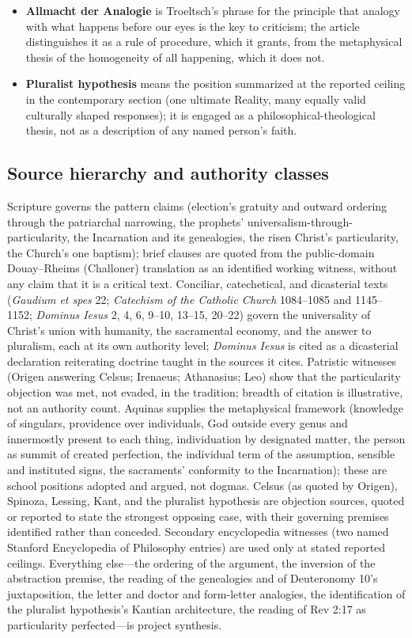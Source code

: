 \begin{itemize}
\item \textbf{Allmacht der Analogie} is Troeltsch's phrase for the principle that analogy with what happens before our eyes is the key to criticism; the article distinguishes it as a rule of procedure, which it grants, from the metaphysical thesis of the homogeneity of all happening, which it does not.
\item \textbf{Pluralist hypothesis} means the position summarized at the reported ceiling in the contemporary section (one ultimate Reality, many equally valid culturally shaped responses); it is engaged as a philosophical-theological thesis, not as a description of any named person's faith.
\end{itemize}

\subsection{Source hierarchy and authority classes}

Scripture governs the pattern claims (election's gratuity and outward ordering through the patriarchal narrowing, the prophets' universalism-through-particularity, the Incarnation and its genealogies, the risen Christ's particularity, the Church's one baptism); brief clauses are quoted from the public-domain Douay--Rheims (Challoner) translation as an identified working witness, without any claim that it is a critical text. Conciliar, catechetical, and dicasterial texts (\emph{Gaudium et spes} 22; \emph{Catechism of the Catholic Church} 1084--1085 and 1145--1152; \emph{Dominus Iesus} 2, 4, 6, 9--10, 13--15, 20--22) govern the universality of Christ's union with humanity, the sacramental economy, and the answer to pluralism, each at its own authority level; \emph{Dominus Iesus} is cited as a dicasterial declaration reiterating doctrine taught in the sources it cites. Patristic witnesses (Origen answering Celsus; Irenaeus; Athanasius; Leo) show that the particularity objection was met, not evaded, in the tradition; breadth of citation is illustrative, not an authority count. Aquinas supplies the metaphysical framework (knowledge of singulars, providence over individuals, God outside every genus and innermostly present to each thing, individuation by designated matter, the person as summit of created perfection, the individual term of the assumption, sensible and instituted signs, the sacraments' conformity to the Incarnation); these are school positions adopted and argued, not dogmas. Celsus (as quoted by Origen), Spinoza, Lessing, Kant, and the pluralist hypothesis are objection sources, quoted or reported to state the strongest opposing case, with their governing premises identified rather than conceded. Secondary encyclopedia witnesses (two named Stanford Encyclopedia of Philosophy entries) are used only at stated reported ceilings. Everything else---the ordering of the argument, the inversion of the abstraction premise, the reading of the genealogies and of Deuteronomy 10's juxtaposition, the letter and doctor and form-letter analogies, the identification of the pluralist hypothesis's Kantian architecture, the reading of Rev 2:17 as particularity perfected---is project synthesis.

